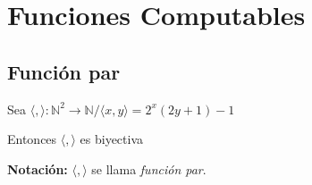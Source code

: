 \chapter{Funciones Computables}

\section{Función par}

\begin{teorema}{}{}
    Sea $\langle , \rangle : \mathbb{N}^2 \to \mathbb{N} / 
    \langle x, y \rangle = 2^x (2y+1) - 1$

    \medskip

    Entonces $\langle , \rangle$ es biyectiva

    \bigskip
    \textbf{Notación:}
    $\langle,\rangle$ se llama \textit{función par}.
\end{teorema}


